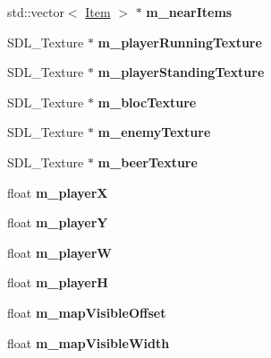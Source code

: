 \begin{DoxyCompactItemize}
std\+::vector$<$ \hyperlink{class_item}{Item} $>$ $\ast$ {\bfseries m\+\_\+near\+Items}
\item 
\mbox{\label{class_play_level_a4bdb33c1715c1f9eb0f3f3f87ed8ffc5}} 
S\+D\+L\+\_\+\+Texture $\ast$ {\bfseries m\+\_\+player\+Running\+Texture}
\item 
\mbox{\label{class_play_level_a8748b27638530f0ebc39ddc13419aa6f}} 
S\+D\+L\+\_\+\+Texture $\ast$ {\bfseries m\+\_\+player\+Standing\+Texture}
\item 
\mbox{\label{class_play_level_af9513ec72490a96fd8b8752bf8e00190}} 
S\+D\+L\+\_\+\+Texture $\ast$ {\bfseries m\+\_\+bloc\+Texture}
\item 
\mbox{\label{class_play_level_a99cbf80480c9d6e211a4673df0f55056}} 
S\+D\+L\+\_\+\+Texture $\ast$ {\bfseries m\+\_\+enemy\+Texture}
\item 
\mbox{\label{class_play_level_a8ddf4e9d4b958b1bded240d5ed343878}} 
S\+D\+L\+\_\+\+Texture $\ast$ {\bfseries m\+\_\+beer\+Texture}
\item 
\mbox{\label{class_play_level_a54c8166c1cfcfcf690ae4c14931e9a7b}} 
float {\bfseries m\+\_\+playerX}
\item 
\mbox{\label{class_play_level_acb23994c5703aa4cf4f2c4911490d50c}} 
float {\bfseries m\+\_\+playerY}
\item 
\mbox{\label{class_play_level_acdf3e418f04ca82ae1bf629d4828b08c}} 
float {\bfseries m\+\_\+playerW}
\item 
\mbox{\label{class_play_level_aab94555b1146c0a50a4caec06287b751}} 
float {\bfseries m\+\_\+playerH}
\item 
\mbox{\label{class_play_level_ae9e6c61dc04b8fbf1b46b02671b6e530}} 
float {\bfseries m\+\_\+map\+Visible\+Offset}
\item 
\mbox{\label{class_play_level_a98a743ae7cc429dafdfe4e7f64a8a1b2}} 
float {\bfseries m\+\_\+map\+Visible\+Width}

\end{DoxyCompactItemize}
